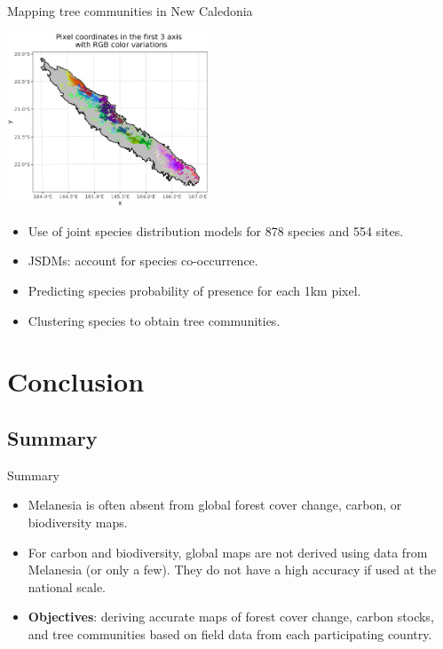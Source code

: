 \documentclass[10pt,table,dvipsnames,compress]{beamer}
\begin{document}
\begin{frame}[label={sec:org8d1dfe4}]{Mapping tree communities in New Caledonia}
\begin{center}
\includegraphics[width=6cm]{figs/biodiv/jSDM-NC.png}
\end{center}

\begin{itemize}
\item Use of joint species distribution models for 878 species and 554 sites.
\item JSDMs: account for species co-occurrence.
\item Predicting species probability of presence for each 1km pixel.
\item Clustering species to obtain tree communities.
\end{itemize}
\end{frame}

\section{Conclusion}
\label{sec:orge46859f}

\subsection{Summary}
\label{sec:org2bf7bd6}

\begin{frame}[label={sec:org01e8b29}]{Summary}
\begin{itemize}
\item Melanesia is often absent from global forest cover change, carbon, or biodiversity maps.
\item For carbon and biodiversity, global maps are not derived using data from Melanesia (or only a few). They do not have a high accuracy if used at the national scale.
\item \textbf{Objectives}: deriving accurate maps of forest cover change, carbon stocks, and tree communities based on field data from each participating country.
\end{itemize}
\end{frame}
\end{document}
